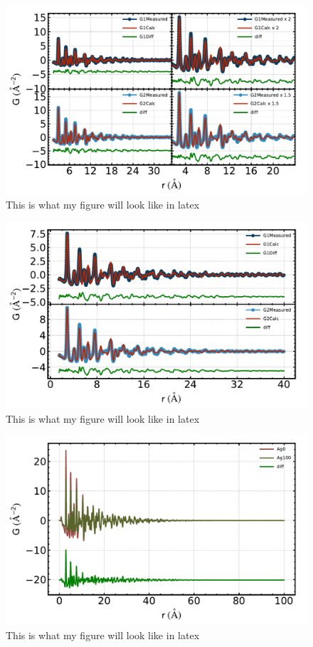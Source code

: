 \documentclass[twocolumn,showpacs,amsmath,amssymb,floatfix,prl]{revtex4-1}
\begin{document}
\lipsum[1-3]
\begin{figure}[tb]
	\centering
	\includegraphics[width=1\columnwidth]{Example_1_MutipanMeasCalcDiff}
	\caption{\label{fig}This is what my figure will look like in latex }
\end{figure}
\lipsum[3-5]
\begin{figure}[tb]
	\centering
	\includegraphics[width=1\columnwidth]{Example_1_TwopanMeasCalcDiff}
	\caption{\label{fig}This is what my figure will look like in latex }
\end{figure}
\lipsum[5-7]
\begin{figure}[tb]
	\centering
	\includegraphics[width=1\columnwidth]{Example_2_MeasCompare}
	\caption{\label{fig}This is what my figure will look like in latex }
\end{figure}
\end{document}
